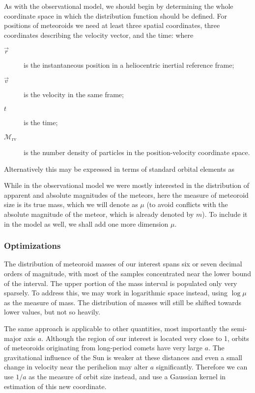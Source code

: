         As with the observational model, we should begin by determining the whole coordinate space
        in which the distribution function should be defined. For positions of meteoroids we need at least
        three spatial coordinates, three coordinates describing the velocity vector, and the time:
        where
        \begin{description}
            \item[$\vec{r}$]
                is the instantaneous position in a heliocentric inertial reference frame;
            \item[$\vec{v}$]
                is the velocity in the same frame;
            \item[$t$]
                is the time;
            \item[$\mathcal{M}_\mathrm{rv}$]
                is the number density of particles in the position-velocity coordinate space.
        \end{description}

        Alternatively this may be expressed in terms of standard orbital elements as

        While in the observational model we were mostly interested in the distribution of apparent and absolute
        magnitudes of the meteors, here the measure of meteoroid size is its true mass, which we will denote as
        $\mu$ (to avoid conflicts with the absolute magnitude of the meteor, which is already denoted by $m$).
        To include it in the model as well, we shall add one more dimension $\mu$.

        \subsubsection{Optimizations} \label{moco}
            The distribution of meteoroid masses of our interest spans six or seven decimal orders of magnitude,
            with most of the samples concentrated near the lower bound of the interval.
            The upper portion of the mass interval is populated only very sparsely.
            To address this, we may work in logarithmic space instead, using $\log \mu$ as the measure of mass.
            The distribution of masses will still be shifted towards lower values, but not so heavily.

            The same approach is applicable to other quantities, most importantly the semi-major axis $a$.
            Although the region of our interest is located very close to \SI{1}{\au},
            orbits of meteoroids originating from long-period comets have very large $a$.
            The gravitational influence of the Sun is weaker at these distances and
            even a small change in velocity near the perihelion may alter $a$ significantly.
            Therefore we can use $1/a$ as the measure of orbit size instead,
            and use a Gaussian kernel in estimation of this new coordinate.

